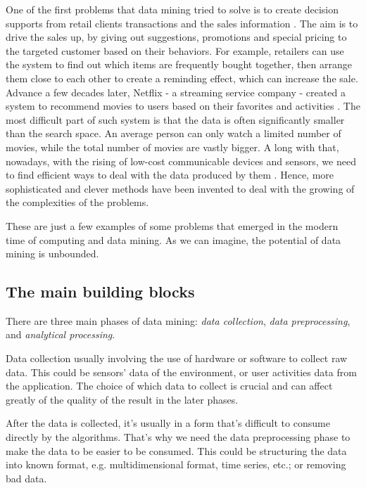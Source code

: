 One of the first problems that data mining tried to solve is to create decision supports from retail clients transactions and the sales information \citep{coenen_datamining_2011}. 
The aim is to drive the sales up, by giving out suggestions, promotions and special pricing to the targeted customer based on their behaviors.
For example, retailers can use the system to find out which items are frequently bought together, then arrange them close to each other to create a reminding effect, which can increase the sale.
Advance a few decades later, Netflix - a streaming service company - created a system to recommend movies to users based on their favorites and activities \citep{netflix_rs_2016}.
The most difficult part of such system is that the data is often significantly smaller than the search space.
An average person can only watch a limited number of movies, while the total number of movies are vastly bigger.
A long with that, nowadays, with the rising of low-cost communicable devices and sensors, we need to find efficient ways to deal with the data produced by them \citep{data_mining_iot_2014}.
Hence, more sophisticated and clever methods have been invented to deal with the growing of the complexities of the problems.

These are just a few examples of some problems that emerged in the modern time of computing and data mining.
As we can imagine, the potential of data mining is unbounded.

\subsection{The main building blocks}
\label{sub:building_blocks}
There are three main phases of data mining: \textit{data collection}, \textit{data preprocessing}, and \textit{analytical processing}.

Data collection usually involving the use of hardware or software to collect raw data.
This could be sensors' data of the environment, or user activities data from the application.
The choice of which data to collect is crucial and can affect greatly of the quality of the result in the later phases.

After the data is collected, it's usually in a form that's difficult to consume directly by the algorithms.
That's why we need the data preprocessing phase to make the data to be easier to be consumed.
This could be structuring the data into known format, e.g. multidimensional format, time series, etc.; or removing bad data.

